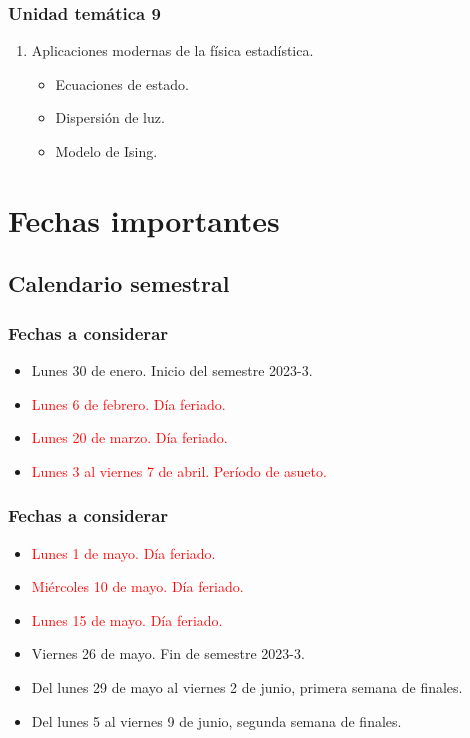 \documentclass[12pt]{beamer}
\begin{document}
\begin{frame}
\frametitle{Unidad temática 9}
\begin{enumerate}[<+->]
\conti
\item Aplicaciones modernas de la física estadística.
\pause
\begin{itemize}[<+->]
    \item[\ding{51}] Ecuaciones de estado.
    \item[\ding{51}] Dispersión de luz.
    \item[\ding{51}] Modelo de Ising.
\end{itemize}
\end{enumerate}
\end{frame}

\section{Fechas importantes}
\subsection{Calendario semestral}

\begin{frame}
\frametitle{Fechas a considerar}
\begin{itemize}[<+->]
\setlength\itemsep{1pt}
\item Lunes 30 de enero. Inicio del semestre 2023-3.
\item \textcolor{red}{Lunes 6 de febrero. Día feriado.}
\item \textcolor{red}{Lunes 20 de marzo. Día feriado.}
\item \textcolor{red}{Lunes 3 al viernes 7 de abril. Período de asueto.}
\end{itemize}
\end{frame}
\begin{frame}
\frametitle{Fechas a considerar}
\begin{itemize}[<+->]
\setlength\itemsep{1pt}
\item \textcolor{red}{Lunes 1 de mayo. Día feriado.}
\item \textcolor{red}{Miércoles 10 de mayo. Día feriado.}
\item \textcolor{red}{Lunes 15 de mayo. Día feriado.}
\item Viernes 26 de mayo. Fin de semestre 2023-3.
\item Del lunes 29 de mayo al viernes 2 de junio, primera semana de finales.
\item Del lunes 5 al viernes 9 de junio, segunda semana de finales.
\end{itemize}
\end{frame}
\end{document}
